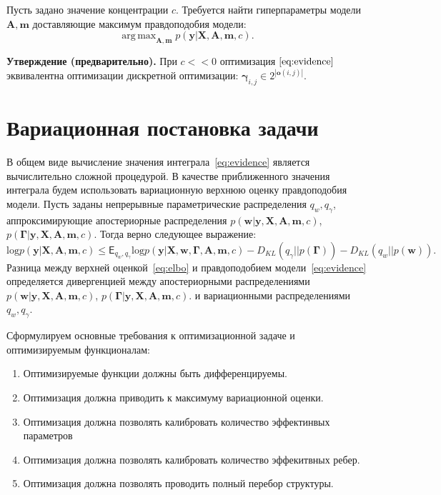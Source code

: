 \documentclass[12pt]{article}
\DeclareMathOperator*{\argmax}{arg\,max}
\begin{document}
Пусть задано значение концентрации $c$. 
Требуется найти гиперпараметры модели $\mathbf{A}, \mathbf{m}$ доставляющие максимум правдоподобия модели:
\[
    \argmax_{\mathbf{A}, \mathbf{m}}  p(\mathbf{y}|\mathbf{X},\mathbf{A},\mathbf{m}, c).
\]

\textbf{Утверждение (предварительно).} При $c << 0$ оптимизация  $\eqref{eq:evidence}$ эквивалентна оптимизации дискретной оптимизации: $\boldsymbol{\gamma}_{i,j} \in 2^{|\mathbf{o}(i,j)|}$.


\section{Вариационная постановка задачи}
В общем виде вычисление значения интеграла~\eqref{eq:evidence} является вычислительно сложной процедурой. В качестве приближенного значения интеграла будем использовать вариационную верхнюю оценку правдоподобия модели. Пусть заданы непрерывные параметрические распределения $q_w, q_\gamma$, аппроксимирующие апостериорные распределения $p(\mathbf{w}|\mathbf{y}, \mathbf{X}, \mathbf{A},\mathbf{m}, c)$, $p(\boldsymbol{\Gamma}|\mathbf{y}, \mathbf{X}, \mathbf{A},\mathbf{m}, c).$ Тогда верно следующее выражение:
\begin{equation}
\label{eq:elbo}
    \text{log} p(\mathbf{y}|\mathbf{X},\mathbf{A},\mathbf{m}, c)  \leq \mathsf{E}_{q_w,q_\gamma}\text{log} p(\mathbf{y}|\mathbf{X},\mathbf{w}, \boldsymbol{\Gamma}, \mathbf{A},\mathbf{m}, c) - {D_{KL}}(q_\gamma||p(\boldsymbol{\Gamma})) - {D_{KL}}(q_{w}||p(\mathbf{w})).
\end{equation}
Разница между верхней оценкой~\eqref{eq:elbo} и правдоподобием модели~\eqref{eq:evidence} определяется дивергенцией между апостериорными распределениями $p(\mathbf{w}|\mathbf{y}, \mathbf{X}, \mathbf{A},\mathbf{m}, c)$, $p(\boldsymbol{\Gamma}|\mathbf{y}, \mathbf{X}, \mathbf{A},\mathbf{m}, c).$ и вариационными распределениями  $q_w, q_\gamma$.

Сформулируем основные требования к оптимизационной задаче и оптимизируемым функционалам:
\begin{enumerate}
\item Оптимизируемые функции должны быть дифференцируемы.
\item Оптимизация должна приводить к максимуму вариационной оценки.
\item Оптимизация должна позволять калибровать количество эффектинвых параметров
\item Оптимизация должна позволять калибровать количество эффекитвных ребер.
\item Оптимизация должна позволять проводить полный перебор структуры.
\end{enumerate}
\end{document}
